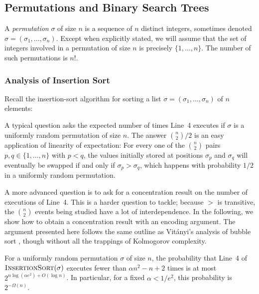 \documentclass{patmorin}
\begin{document}
\subsection{Permutations and Binary Search Trees}

A \emph{permutation} $\sigma$ of size $n$ is a sequence of $n$
distinct integers, sometimes denoted
$\sigma = (\sigma_1, \ldots, \sigma_n)$. Except when explicitly
stated, we will assume that the set of integers involved in a
permutation of size $n$ is precisely $\{1, \ldots, n\}$. The number of
such permutations is $n!$.

\subsubsection{Analysis of Insertion Sort}

Recall the insertion-sort algorithm for sorting a list
$\sigma = (\sigma_1,\ldots,\sigma_n)$ of $n$ elements:

\begin{algorithmic}[1]
     \ENDWHILE
  \ENDFOR
\end{algorithmic}

A typical question asks the expected number of times Line~4 executes
if $\sigma$ is a uniformly random permutation of size $n$.  The answer
$\binom{n}{2}/2$ is an easy application of linearity of expectation:
For every one of the $\binom{n}{2}$ pairs $p,q\in\{1,\ldots,n\}$ with
$p<q$, the values initially stored at positions $\sigma_p$ and
$\sigma_q$ will eventually be swapped if and only if
$\sigma_p > \sigma_q$, which happens with probability $1/2$ in a
uniformly random permutation.

A more advanced question is to ask for a concentration result on the
number of executions of Line~4. This is a harder question to tackle;
because $>$ is transitive, the $\binom{n}{2}$ events being studied
have a lot of interdependence. In the following, we show how to obtain
a concentration result with an encoding argument.  The argument
presented here follows the same outline as Vit\'{a}nyi's analysis of
bubble sort \cite{vitanyi:analysis}, though without all the trappings
of Kolmogorov complexity.

\begin{thm}
  For a uniformly random permutation $\sigma$ of size $n$, the
  probability that Line~4 of $\textsc{InsertionSort}(\sigma)$ executes
  fewer than $\alpha n^2 - n + 2$ times is at most $2^{n\log(\alpha
    e^2)+O(\log n)}$.  In particular, for a fixed $\alpha < 1/e^2$,
  this probability is $2^{-\Omega(n)}$.
\end{thm}
\end{document}
